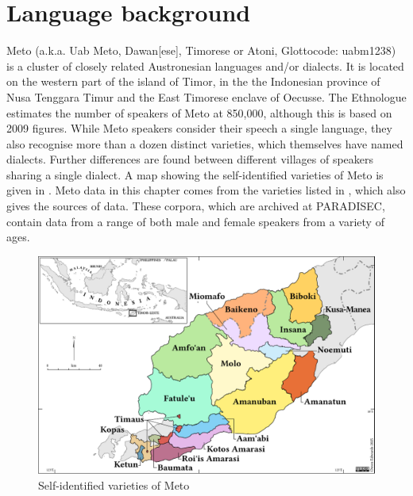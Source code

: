 \documentclass[output=paper]{langscibook}
\begin{document}
\section{Language background}\label{sec:LangBack}
Meto (a.k.a. Uab Meto, Dawan[ese], Timorese or Atoni, Glottocode:  uabm1238)
is a cluster of closely related Austronesian languages and/or dialects.
It is located on the western part of the island of Timor,
in the the Indonesian province of Nusa Tenggara Timur and
the East Timorese enclave of Oecusse.
The Ethnologue \citep{ethnologue} estimates the number of speakers
of Meto at 850,000, although this is based on 2009 figures.
While Meto speakers consider their speech a single language,
they also recognise more than a dozen distinct
varieties, which themselves have named dialects.
Further differences are found between different
villages of speakers sharing a single dialect. 
A map showing the self-identified
varieties of Meto is given in .
Meto data in this chapter comes from the varieties
listed in , which also gives the sources of data.
These corpora, which are archived at PARADISEC, contain data from a range of both male and female
speakers from a variety of ages.

\begin{figure}
	\caption{Self-identified varieties of Meto}\label{fig:SelIdeVarMet}
	\includegraphics[width=\columnwidth]{figures/Metos}
\end{figure}
\end{document}
